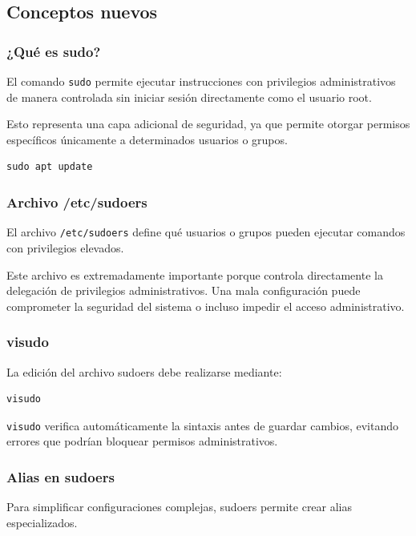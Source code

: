 \documentclass[11pt, letterpaper]{article}
\begin{document}
\subsection{Conceptos nuevos}
\label{sec:org7bf7cac}

\subsubsection{¿Qué es sudo?}
\label{sec:org1cf02b9}

El comando \texttt{sudo} permite ejecutar instrucciones con privilegios administrativos de manera controlada sin iniciar sesión directamente como el usuario root.

Esto representa una capa adicional de seguridad, ya que permite otorgar permisos específicos únicamente a determinados usuarios o grupos.

\begin{verbatim}
sudo apt update
\end{verbatim}
\subsubsection{Archivo /etc/sudoers}
\label{sec:org2e89764}

El archivo \texttt{/etc/sudoers} define qué usuarios o grupos pueden ejecutar comandos con privilegios elevados.

Este archivo es extremadamente importante porque controla directamente la delegación de privilegios administrativos. Una mala configuración puede comprometer la seguridad del sistema o incluso impedir el acceso administrativo.
\subsubsection{visudo}
\label{sec:org3c6c8d8}

La edición del archivo sudoers debe realizarse mediante:

\begin{verbatim}
visudo
\end{verbatim}

\texttt{visudo} verifica automáticamente la sintaxis antes de guardar cambios, evitando errores que podrían bloquear permisos administrativos.
\subsubsection{Alias en sudoers}
\label{sec:org8a99b18}

Para simplificar configuraciones complejas, sudoers permite crear alias especializados.
\end{document}
